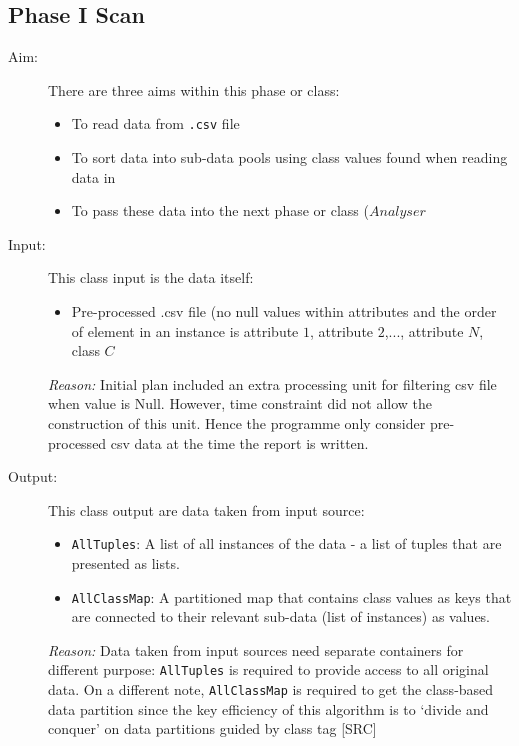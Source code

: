 \subsection{Phase I Scan}

\begin{description}

\item[Aim: ] There are three aims within this phase or class:
\begin{itemize}
	\item{To read data from \texttt{.csv} file} 
	\item{To sort data into sub-data pools using class values found when reading data in} 
	\item{To pass these data into the next phase or class ($Analyser$} 
\end{itemize}

\item[Input: ] This class input is the data itself:
\begin{itemize}
	\item{Pre-processed .csv file (no null values within attributes and the order of element in an instance is {attribute $1$, attribute $2$,..., attribute $N$, class $C$}}
\end{itemize} 

\textit{Reason: } Initial plan included an extra processing unit for filtering csv file when value is Null. However, time constraint did not allow the construction of this unit. Hence the programme only consider pre-processed csv data at the time the report is written.

\item[Output: ] This class output are data taken from input source:
\begin{itemize}
	\item{\texttt{AllTuples}: A list of all instances of the data - a list of tuples that are presented as lists.}
	\item{\texttt{AllClassMap}: A partitioned map that contains class values as keys that are connected to their relevant sub-data (list of instances) as values.}
\end{itemize}
  
\textit{Reason: } Data taken from input sources need separate containers for different purpose: \texttt{AllTuples} is required to provide access to all original data. On a different note, \texttt{AllClassMap} is required to get the class-based data partition since the key efficiency of this algorithm is to `divide and conquer' on data partitions guided by class tag [SRC]


\end{description}
